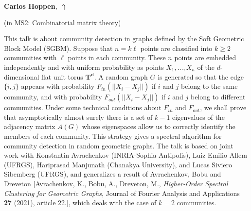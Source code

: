 \documentclass[ILAS2025-program.tex]{subfiles}
\begin{document}
\hypertarget{down0296}{}\begin{ilasabstract}
    
\textbf{Carlos Hoppen},  \hfill \hyperlink{up0296}{$\Uparrow$}
    
    
(in {\color{mstitle}MS2: Combinatorial matrix theory})
        
\mtskip
    This talk is about community detection in graphs defined by the Soft Geometric Block Model (SGBM). Suppose that $n=k \ell$ points are classified into $k \geq 2$ communities with $\ell$ points in each community. These $n$ points are embedded independently and with uniform probability as points $X_1,\ldots,X_n$ of the $d$-dimensional flat unit torus $\mathbf{T^d}$. A random graph $G$ is generated so that the edge $\{i,j\}$ appears with probability $F_{in}(||X_i-X_j||)$ if $i$ and $j$ belong to the same community, and with probability $F_{out}(||X_i-X_j||)$  if $i$ and $j$ belong to different communities. Under some technical conditions about $F_{in}$ and $F_{out}$, we shall prove that asymptotically almost surely there is a set of $k-1$ eigenvalues of the adjacency matrix $A(G)$ whose eigenspaces allow us to correctly identify the members of each community. This strategy gives a spectral algorithm for community detection in random geometric graphs. The talk is based on joint work with Konstantin Avrachenkov (INRIA-Sophia Antipolis), Luiz Emilio Allem (UFRGS), Hariprasad Manjunath (Chanakya University), and Lucas Siviero Sibemberg (UFRGS), and generalizes a result of Avrachenkov, Bobu and Dreveton [Avrachenkov, K., Bobu, A., Dreveton, M., \emph{Higher-Order Spectral Clustering for Geometric Graphs}, Journal of Fourier Analysis and Applications {\bf 27} (2021), article 22.], which deals with the case of $k=2$ communities. 

\end{ilasabstract}
    
\end{document}
